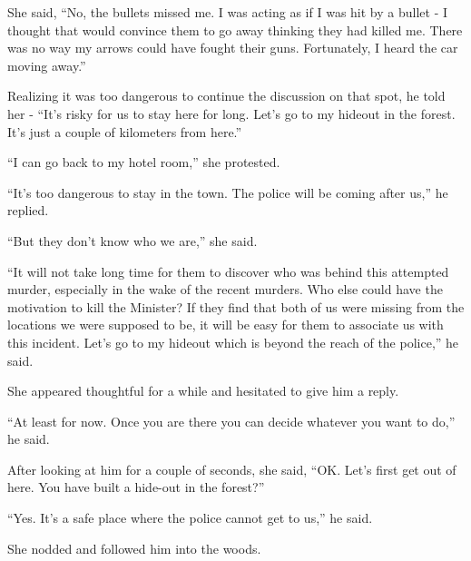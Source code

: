 She said, “No, the bullets missed me. I was acting as if I was hit by a bullet -
I thought that would convince them to go away thinking they had killed me. There
was no way my arrows could have fought their guns. Fortunately, I heard the car
moving away.”

Realizing it was too dangerous to continue the discussion on that spot, he told
her - “It's risky for us to stay here for long. Let's go to my hideout in the
forest. It's just a couple of kilometers from here.”

“I can go back to my hotel room,” she protested.

“It's too dangerous to stay in the town. The police will be coming after us,” he
replied.

“But they don't know who we are,” she said.

“It will not take long time for them to discover who was behind this attempted
murder, especially in the wake of the recent murders. Who else could have the
motivation to kill the Minister? If they find that both of us were missing from
the locations we were supposed to be, it will be easy for them to associate us
with this incident. Let's go to my hideout which is beyond the reach of the
police,” he said.

She appeared thoughtful for a while and hesitated to give him a reply.

“At least for now. Once you are there you can decide whatever you want to do,”
he said.

After looking at him for a couple of seconds, she said, “OK. Let's first get out
of here. You have built a hide-out in the forest?”

“Yes. It's a safe place where the police cannot get to us,” he said.

She nodded and followed him into the woods.